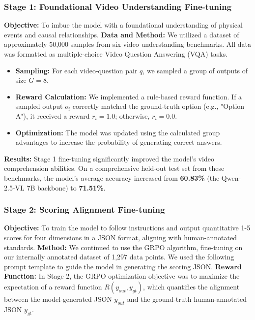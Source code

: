 \subsubsection*{Stage 1: Foundational Video Understanding Fine-tuning}
\textbf{Objective:} To imbue the model with a foundational understanding of physical events and causal relationships.
\textbf{Data and Method:} We utilized a dataset of approximately 50,000 samples from six video understanding benchmarks. All data was formatted as multiple-choice Video Question Answering (VQA) tasks.
\begin{itemize}
    \item \textbf{Sampling:} For each video-question pair $q$, we sampled a group of outputs of size $G=8$.
    \item \textbf{Reward Calculation:} We implemented a rule-based reward function. If a sampled output $o_i$ correctly matched the ground-truth option (e.g., "Option A"), it received a reward $r_i = 1.0$; otherwise, $r_i = 0.0$.
    \item \textbf{Optimization:} The model was updated using the calculated group advantages to increase the probability of generating correct answers.
\end{itemize}


\textbf{Results:} Stage 1 fine-tuning significantly improved the model's video comprehension abilities. On a comprehensive held-out test set from these benchmarks, the model's average accuracy increased from \textbf{60.83\%} (the Qwen-2.5-VL 7B backbone) to \textbf{71.51\%}.

\subsubsection*{Stage 2: Scoring Alignment Fine-tuning}
\textbf{Objective:} To train the model to follow instructions and output quantitative 1-5 scores for four dimensions in a JSON format, aligning with human-annotated standards.
\textbf{Method:} We continued to use the GRPO algorithm, fine-tuning on our internally annotated dataset of 1,297 data points. We used the following prompt template to guide the model in generating the scoring JSON.
\textbf{Reward Function:}
In Stage 2, the GRPO optimization objective was to maximize the expectation of a reward function $R(y_{out}, y_{gt})$, which quantifies the alignment between the model-generated JSON $y_{out}$ and the ground-truth human-annotated JSON $y_{gt}$.

